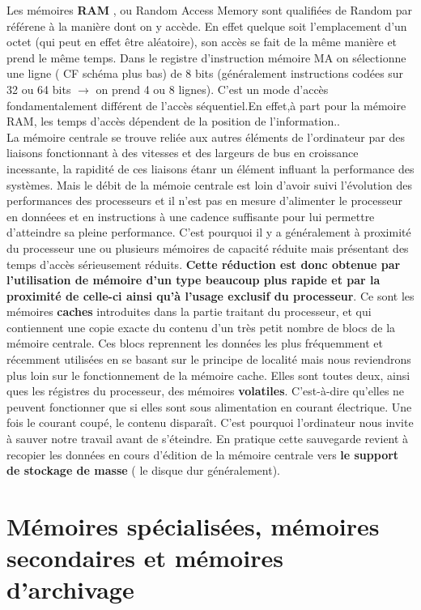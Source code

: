 \documentclass{report}
\begin{document}
Les mémoires {\bf RAM }, ou Random Access Memory sont qualifiées de  Random par référene à la manière dont on y accède. En effet quelque soit l'emplacement d'un octet (qui peut en effet être aléatoire), son accès se fait de la même manière et prend le même temps. Dans le registre d'instruction mémoire MA on sélectionne une ligne ( CF schéma plus bas) de 8 bits (généralement instructions codées sur 32 ou 64 bits  $\rightarrow$ on prend 4 ou 8  lignes). C'est un mode d'accès fondamentalement différent de l'accès séquentiel.En effet,à part pour la mémoire RAM, les temps d'accès dépendent de la position de l'information..\\
La mémoire centrale se trouve reliée aux autres éléments de l'ordinateur par des liaisons fonctionnant à des vitesses et des largeurs de bus en croissance incessante, la rapidité de ces liaisons étanr un élément influant la performance des systèmes. Mais le débit de la mémoie centrale est loin d'avoir suivi l'évolution des performances des processeurs et il n'est pas en mesure d'alimenter le processeur en donnéees et en instructions à une cadence suffisante pour lui permettre d'atteindre sa pleine performance. C'est pourquoi il y a généralement à proximité du processeur une ou plusieurs mémoires de capacité réduite mais présentant des temps d'accès sérieusement réduits. {\bf Cette réduction est donc obtenue par l'utilisation de mémoire d'un type beaucoup plus rapide et par la proximité de celle-ci ainsi qu'à l'usage exclusif du processeur}. Ce sont les mémoires {\bf caches} introduites dans la partie traitant du processeur, et qui contiennent une copie exacte du contenu d'un très petit nombre de blocs de la mémoire centrale. Ces blocs reprennent les données les plus fréquemment et récemment utilisées en se basant sur le principe de localité mais nous reviendrons plus loin sur le fonctionnement de la mémoire cache. Elles sont toutes deux, ainsi ques les régistres du processeur, des mémoires {\bf volatiles}. C'est-à-dire qu'elles ne peuvent fonctionner que si elles sont sous alimentation en courant électrique. Une fois le courant coupé, le contenu disparaît. C'est pourquoi l'ordinateur nous invite à sauver notre travail avant de s'éteindre. En pratique cette sauvegarde revient à recopier les données en cours d'édition de la mémoire centrale vers {\bf le support de stockage de masse} ( le disque dur généralement).

\section{Mémoires spécialisées, mémoires secondaires et mémoires d'archivage }
\end{document}
